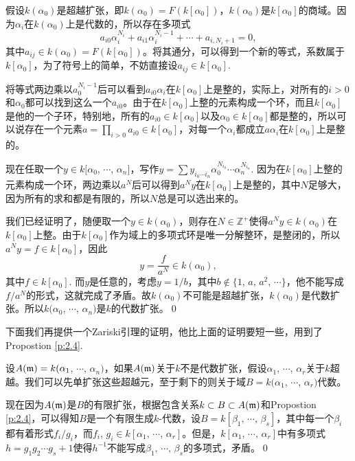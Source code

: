 	假设$k(\alpha_0)$是超越扩张，即$k(\alpha_0)=F(k[\alpha_0])$，$k(\alpha_0)$是$k[\alpha_0]$的商域。因为$\alpha_i$在$k(\alpha_0)$上是代数的，所以存在多项式
	\[
		a_{i0}\alpha_i^{N_i}+a_{i1}\alpha_i^{N_i-1}+\cdots +a_{i,N_i+1}=0,
	\]
	其中$a_{ij}\in k(\alpha_0)=F(k[\alpha_0])$。将其通分，可以得到一个新的等式，系数属于$k[\alpha_0]$，为了符号上的简单，不妨直接设$a_{ij}\in k[\alpha_0]$.

	将等式两边乘以$a_0^{N_i-1}$后可以看到$a_{i0}\alpha_i$在$k[\alpha_0]$上是整的，实际上，对所有的$i>0$和$\alpha_0$都可以找到这么一个$a_{i0}$。由于在$k[\alpha_0]$上整的元素构成一个环，而且$k[\alpha_0]$是他的一个子环，特别地，所有的$a_{i0}\in k[\alpha_0]$以及$\alpha_0\in k[\alpha_0]$都是整的，所以可以说存在一个元素$a=\prod_{i>0}a_{i0}\in k[\alpha_0]$，对每一个$\alpha_i$都成立$a\alpha_i$在$k[\alpha_0]$上是整的。

	现在任取一个$y\in k[\alpha_0$, $\cdots$, $\alpha_n]$，写作$y=\sum y_{i_0 \cdots i_n}\alpha_0^{N_{i_0}}\cdots\alpha_{n}^{N_{i_n}}$.
	因为在$k[\alpha_0]$上整的元素构成一个环，两边乘以$a^N$后可以得到$a^Ny$在$k[\alpha_0]$上是整的，其中$N$足够大，因为所有的求和都是有限的，所以$N$总是可以选出来的。

	我们已经证明了，随便取一个$y\in k(\alpha_0)$，则存在$N\in \mathbb{Z}^+$使得$a^Ny\in k(\alpha_0)$在$k[\alpha_0]$上整。由于$k[\alpha_0]$作为域上的多项式环是唯一分解整环，是整闭的，所以$a^Ny=f\in k[\alpha_0]$，因此
	\[
		y=\frac{f}{a^N}\in k(\alpha_0),
	\]
	其中$f\in k[\alpha_0]$. 而$y$是任意的，考虑$y=1/b$，其中$b\not\in \{1$, $a$, $a^2$, $\cdots\}$，他不能写成$f/a^N$的形式，这就完成了矛盾。故$k(\alpha_0)$不可能是超越扩张，$k(\alpha_0)$是代数扩张。所以$k(\alpha_0$, $\cdots$, $\alpha_{n})$是$k$的代数扩张。\qed

下面我们再提供一个Zariski引理的证明，他比上面的证明要短一些，用到了Propostion \eqref{p:2.4}.

\proof 设$A(\mathfrak{m})=k(\alpha_1$, $\cdots$, $\alpha_n)$，如果$A(\mathfrak{m})$关于$k$不是代数扩张，假设$\alpha_1$, $\cdots$, $\alpha_r$关于$k$超越。我们可以先单扩张这些超越元，至于剩下的则关于域$B=k(\alpha_1$, $\cdots$, $\alpha_r)$代数。

现在因为$A(\mathfrak{m})$是$B$的有限扩张，根据包含关系$k\subset B\subset A(\mathfrak{m})$和Propostion \eqref{p:2.4}，可以得知$B$是一个有限生成$k$-代数，设$B=k[\beta_1,\,\cdots\!,\,\beta_s]$，其中每一个$\beta_i$都有着形式$f_i/g_i$，而$f_i$, $g_i\in k[\alpha_1,\,\cdots\!,\,\alpha_r]$。但是，$k[\alpha_1,\,\cdots\!,\,\alpha_r]$中有多项式$h=g_1g_2\cdots g_{s}+1$使得$h^{-1}$不能写成$\beta_1,\,\cdots\!,\,\beta_s$的多项式，矛盾。\qed

